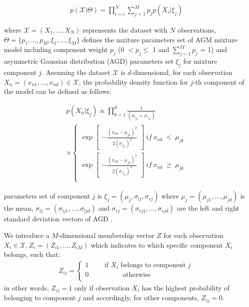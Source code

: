 \documentclass[conference]{IEEEtran}
\begin{document}
\begin{align}
p(\mathcal{X}|\Theta) = \prod_{i=i}^N \sum_{j=1}^Mp_jp(X_i|\xi_j)
\label{eq:likelihood}
\end{align}

where $\mathcal{X} = (X_1,...,X_N)$ reprensents the dataset with $N$ observations, $\Theta = \{p_1,...,p_M, \xi_1,...,\xi_M\}$ defines the mxiture parameters set of AGM mixture model including component weight $p_j$ (0 $< p_j \leq$ 1 and $\sum_{j=1}^Mp_j$ = 1) and asymmetric Gaussian distribution (AGD) parameters set $\xi_j$ for mixture component $j$. Assuming the dataset $\mathcal{X}$ is $d$-dimensional, for each observation $X_n = (x_{n1},...,x_{nd})\in\mathcal{X}$, the probability density function\cite{b2} for $j$-th component of the model can be defined as follows:

\begin{multline}
p(X_n|\xi_j) \propto \prod_{k=1}^{d} \frac{1}{(\sigma_{l_{jk}}+\sigma_{r_{jk}})} \\
\times \left\{\begin{matrix}
\exp \begin{bmatrix}
-\frac{(x_{nk}-\mu_{jk})^2}{2(\sigma_{l_{jk}})^2}
\end{bmatrix}\ if\ x_{nk}\ <\ \mu_{jk} \\ 
\exp \begin{bmatrix}
-\frac{(x_{nk}-\mu_{jk})^2}{2(\sigma_{r_{jk}})^2}
\end{bmatrix}\ if\ x_{nk}\ \geqslant\ \mu_{jk} \\ 
\end{matrix}\right.
\label{eq:pdf}
\end{multline}

parameters set of component $j$ is $\xi_j = (\mu_j,\sigma_{lj},\sigma_{rj})$ where $\mu_j = (\mu_{j1},...,\mu_{jd})$ is the mean, $\sigma_{lj} = (\sigma_{lj1},...,\sigma_{ljd})$ and $\sigma_{rj} = (\sigma_{rj1},...,\sigma_{rjd})$ are the left and right standard deviation vectors of AGD . 

We introduce a $M$-dimensional membership vector $Z$ for each observation $X_i\in\mathcal{X}, Z_i = (Z_{i1},...,Z_{iM})$ which indicates to which specific component $X_i$ belongs\cite{b8}, such that:
\begin{align}
Z_{ij} = \left\{\begin{matrix}
1\qquad\mbox{ if }X_i\mbox{  belongs to component }j \\
0\qquad\quad\qquad \mbox{otherwise} \qquad\qquad\quad\quad \\
\end{matrix}\right.
\label{eq:memVector}
\end{align}
in other words, $Z_{ij} = 1$ only if observation $X_i$ has the highest probability of belonging to component $j$ and accordingly, for other components, $Z_{ij} = 0$. 
\end{document}
